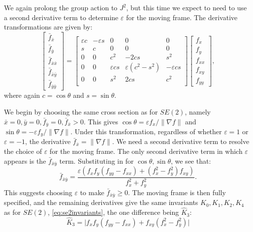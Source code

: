 \documentclass[review,onefignum,onetabnum]{siamonline190516}
\begin{document}
We again prolong the group action to $J^2$, but this time we expect to need
to use a second derivative term to determine $\varepsilon$ for the moving
frame. The derivative transformations are given by:
\begin{equation}
  \begin{bmatrix}
  \bar f_{\bar x} \\ \bar f_{\bar y} \\ \bar f_{\bar{x}\bar{x}} \\ \bar f_{\bar{x}\bar{y}} \\ \bar f_{\bar{y}\bar{y}}
  \end{bmatrix} = 
  \begin{bmatrix}
 \varepsilon c & -\varepsilon s & 0 & 0 & 0 \\
 s & c & 0 & 0 & 0 \\
0 & 0 & c^2 & -2cs & s^2 \\
0 & 0 & \varepsilon cs & \varepsilon(c^2 - s^2) & -\varepsilon cs \\
0 & 0 & s^2 & 2cs & c^2 \\
  \end{bmatrix}
  \begin{bmatrix}
f_x \\ f_y \\ f_{xx} \\ f_{xy} \\ f_{yy} 
  \end{bmatrix},
\label{eqn:E2prolongation}
\end{equation}
where again $c = \cos\theta$ and $s = \sin\theta$.  

We begin by choosing the same cross section as for $SE(2)$, namely $\bar{x} = 0,
\bar{y} = 0, \bar{f}_{\bar{y}} = 0, \bar{f}_{\bar{x}} > 0$. This gives
$\cos\theta = \varepsilon f_x / \lVert \nabla f \rVert$ and $\sin\theta =
-\varepsilon f_y / \lVert \nabla f \rVert$. Under this transformation,
regardless of whether $\varepsilon = 1$ or $\varepsilon = -1$, the
derivative $\bar{f}_{\bar{x}} = \lVert \nabla f \rVert$. We need a second
derivative term to resolve the choice of $\varepsilon$ for the moving
frame. The only second derivative term in which $\varepsilon$ appears is
the $\bar{f}_{\bar{x}\bar{y}}$ term. Substituting in for $\cos\theta,
\sin\theta$, we see that:
\begin{equation*}
    \bar{f}_{\bar{x}\bar{y}} = \frac{\varepsilon(f_xf_y(f_{yy} - f_{xx}) + (f_x^2 -
    f_y^2)f_{xy})}{f_x^2 + f_y^2}.
\end{equation*}
This suggests choosing $\varepsilon$ to make $\bar{f}_{\bar{x}\bar{y}} \ge
0$. The moving frame is then fully specified, and the remaining derivatives
give the same invariants $K_0, K_1, K_2, K_4$ as for $SE(2)$,
\eqref{eq:se2invariants}, the one difference being $\hat{K}_3$:
\begin{equation}\label{eq:e2invariants}
    \hat{K}_3 = \lvert f_x f_y (f_{yy} - f_{xx}) + f_{xy} (f_x^2 - f_y^2)\rvert
\end{equation}
\end{document}
